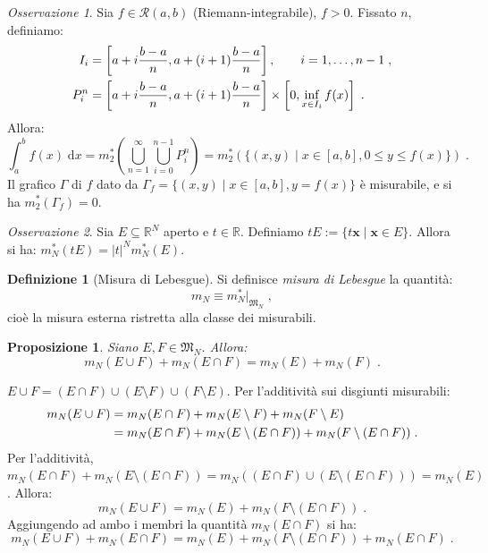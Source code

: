 \documentclass[a4paper,12pt]{report}
\theoremstyle{plain}
\newtheorem{prop}{Proposizione}[section]
\theoremstyle{definition}
\newtheorem{defn}{Definizione}[section]
\theoremstyle{remark}
\newtheorem{oss}{Osservazione}[section]
\newcommand{\diff}[1]{\mathrm{d}#1}
\numberwithin{equation}{section}
\begin{document}
\begin{oss} Sia $f \in \mathcal{R}(a,b)$ (Riemann-integrabile), $f>0$. Fissato $n$, definiamo:
\begin{align}
I_i &=\left[a+i\frac{b-a}{n},a+(i+1)\frac{b-a}{n}\right],\qquad i=1,\ldots, n-1\;, \notag \\
P_i^n &= \left[a+i\frac{b-a}{n},a+(i+1)\frac{b-a}{n}\right]\times \left[0,\inf_{x\in I_i}f(x)\right]\;.
\end{align}
Allora:
\begin{equation}
\int_a^b f(x)\;\diff{x}=m_2^*\left(\bigcup_{n=1}^{\infty}\bigcup_{i=0}^{n-1} P_i^n\right)=m_2^*(\{(x,y)\;|\;x \in [a,b], 0\le y\le f(x)\})\;.
\end{equation}
Il grafico $\Gamma$ di $f$ dato da $\Gamma_f=\{(x,y)\;|\;x\in [a,b],y=f(x)\}$ è misurabile, e si ha $m_2^*(\Gamma_f)=0$.
\end{oss}
\begin{oss} Sia $E\subseteq \mathbb{R}^N$ aperto e $t\in \mathbb{R}$. Definiamo $tE:=\{t\mathbf{x}\;|\;\mathbf{x}\in E\}$. Allora si ha:
$m_N^*(tE)=|t|^Nm_N^*(E)$.
\end{oss}
\begin{defn}[Misura di Lebesgue] Si definisce \textit{misura di Lebesgue} la quantità:
\begin{equation}
m_N\equiv m_N^*|_{\mathfrak{M}_N}\;,
\end{equation}
cioè la misura esterna ristretta alla classe dei misurabili.
\end{defn}
\begin{prop} Siano $E,F \in \mathfrak{M}_N$. Allora:
\begin{equation}
m_N(E\cup F)+m_N(E\cap F)=m_N(E)+m_N(F)\;.
\end{equation}
\end{prop}
\proof $E\cup F=(E\cap F)\cup(E\setminus F)\cup(F\setminus E)$. Per l'additività sui disgiunti misurabili:
\begin{align}
m_N(E\cup F) &= m_N(E\cap F)+m_N(E\setminus F)+m_N(F\setminus E) \notag \\
&= m_N(E\cap F)+m_N(E\setminus(E\cap F))+m_N(F\setminus(E\cap F))\;.
\end{align}
Per l'additività, $m_N(E\cap F)+m_N(E\setminus(E\cap F))=m_N((E\cap F)\cup(E\setminus(E\cap F)))=m_N(E)$. Allora:
\begin{equation}
m_N(E\cup F)=m_N(E)+m_N(F\setminus(E\cap F))\;.
\end{equation}
Aggiungendo ad ambo i membri la quantità $m_N(E\cap F)$ si ha:
\begin{equation}
m_N(E\cup F)+m_N(E\cap F)=m_N(E)+m_N(F\setminus(E\cap F))+m_N(E\cap F)\;.
\end{equation}
\end{document}
